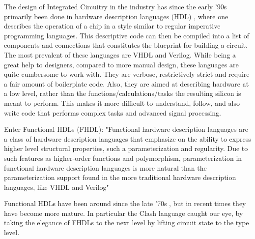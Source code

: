 The design of Integrated Circuitry in the industry has since the early '90s 
primarily been done in hardware description languages (HDL) \cite{ChenG}, 
where one describes the operation of a chip in a style similar to regular 
imperative programming languages. This descriptive code can then be compiled 
into a list of components and connections that constitutes the blueprint for 
building a circuit. The most prevalent of these languages are VHDL and 
Verilog. While being a great help to designers, compared to more manual 
design, these languages are quite cumbersome to work with. They are verbose, 
restrictively strict and require a fair amount of boilerplate code. Also, 
they are aimed at describing hardware at a low level, rather than the 
functions/calculations/tasks the resulting silicon is meant to perform. This 
makes it more difficult to understand, follow, and also write code that 
performs complex tasks and advanced signal processing.

Enter Functional HDLs (FHDL): 
"Functional hardware description languages are a class of hardware description languages that emphasize on the ability to express higher level structural properties, such a parameterization and regularity.  Due to such features as higher-order functions and polymorphism, parameterization in functional hardware description languages is more natural than the parameterization support found in the more traditional hardware description languages, like VHDL and Verilog" \cite{Baaij}

Functional HDLs have been around since the late '70s \cite{ChenG}, but in 
recent times they have become more mature. In particular the Clash language 
caught our eye, by taking the elegance of FHDLs to the next level by lifting 
circuit state to the type level.